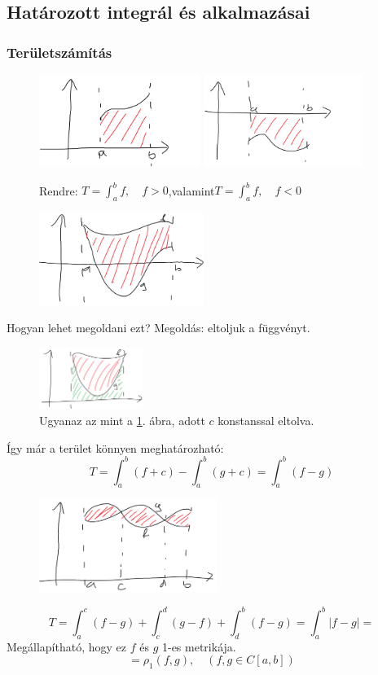 \documentclass[a4paper,11.5pt]{article}
\begin{document}
	\subsection{Határozott integrál és alkalmazásai}
	\subsubsection{Területszámítás}
		\begin{figure}[H]
			\centering
			\includegraphics[height=3cm]{kepek/01.png}
			\includegraphics[height=3cm]{kepek/02.png}
			\caption{Rendre: $T=\int_a^bf,\quad f>0$,\quad valamint\quad  $T=\int_a^bf,\quad f<0$}
		\end{figure}
		\begin{figure}[H]
			\centering
			\includegraphics[height=3cm]{kepek/03.png}
			\caption{}\label{eltolatlan-fv}
		\end{figure}
		Hogyan lehet megoldani ezt? Megoldás: eltoljuk a függvényt.
		\begin{figure}[H]
			\centering
			\includegraphics[height=2cm]{kepek/04.png}
			\caption{Ugyanaz az mint a \ref{eltolatlan-fv}. ábra, adott $c$ konstanssal eltolva.}
		\end{figure}
		Így már a terület könnyen meghatározható:
		\[ T=\int_a^b(f+c)-\int_a^b(g+c)=\int_a^b(f-g) \]
		\begin{figure}[H]
			\centering
			\includegraphics[height=3cm]{kepek/05.png}
			\caption{}
		\end{figure}
		\[ T=\int_a^c(f-g)+\int_c^d(g-f)+\int_d^b(f-g)=\int_a^b|f-g|= \]
		Megállapítható, hogy ez $f$ és $g$ 1-es metrikája.
		\[ =\rho_1(f,g),\quad (f,g\in C[a,b]) \]
		
\end{document}
